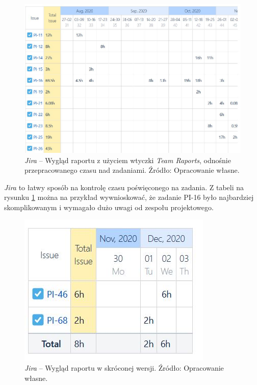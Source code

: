 \documentclass[twoside]{projektInzynierskiMS}
\numberwithin{figure}{section}
\begin{document}
\begin{figure}[h!]
  \centering
  \includegraphics[scale=0.6]{images/jira6.JPG}
    \caption{\textit{Jira} -- Wygląd raportu z użyciem wtyczki \textit{Team Raports}, odnośnie przepracowanego czasu nad zadaniami. Źródło: Opracowanie własne.}
    \label{fig:jira_raport}
\end{figure}

\newpage

\textit{Jira} to łatwy sposób na kontrolę czasu poświęconego na zadania. Z tabeli na rysunku \ref{fig:jira_raport} można na przykład wywnioskować, że zadanie PI-16 było najbardziej skomplikowanym i wymagało dużo uwagi od zespołu projektowego.

\begin{figure}[h!]
  \centering
  \includegraphics[scale=1]{images/jira7.JPG}
    \caption{\textit{Jira} -- Wygląd raportu w skróconej wersji. Źródło: Opracowanie własne.}
    \label{fig:jira_raport_short}
\end{figure}
\end{document}
